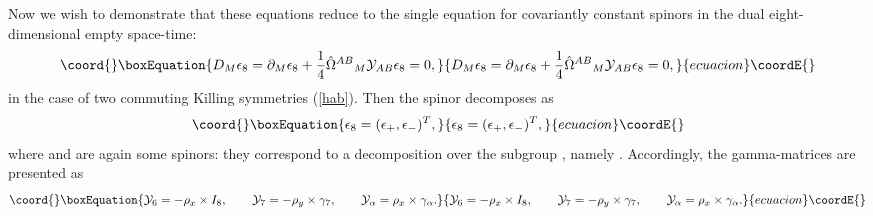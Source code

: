 \documentclass[a4paper,12pt]{article}
\begin{document}
Now we wish to demonstrate that these equations reduce to the
single equation for covariantly constant spinors in the dual
eight-dimensional empty space-time:
\begin{equation}\coord{}\boxEquation{\label{8dk}
D_M \epsilon_8 = \partial_M \epsilon_8 + \frac14 \hat
\Omega^{AB}{}_M {\cal Y}_{AB} \epsilon_8 = 0,
}{D_M \epsilon_8 = \partial_M \epsilon_8 + \frac14 \hat
\Omega^{AB}{}_M {\cal Y}_{AB} \epsilon_8 = 0,
}{ecuacion}\coordE{}\end{equation}
in the case of two commuting Killing symmetries (\ref{hab}).
Then the \coordHE{} spinor decomposes as \coordHE{}
\begin{equation}\coord{}\boxEquation{
\epsilon_8 = (\epsilon_+, \epsilon_-)^T,
}{
\epsilon_8 = (\epsilon_+, \epsilon_-)^T,
}{ecuacion}\coordE{}\end{equation}
where \myHighlight{$\epsilon_{+}$}\coordHE{} and \myHighlight{$\epsilon_{-}$}\coordHE{} are again some \coordHE{}
spinors: they correspond to a decomposition over the subgroup
\coordHE{}, namely \coordHE{}.
Accordingly, the \coordHE{} gamma-matrices are presented as
\begin{equation}\coord{}\boxEquation{
{\cal Y}_6 = -\rho_x \times I_8 , \qquad {\cal Y}_7 = - \rho_y
\times \gamma_7, \qquad {\cal Y}_\alpha = \rho_x \times
\gamma_\alpha.
}{
{\cal Y}_6 = -\rho_x \times I_8 , \qquad {\cal Y}_7 = - \rho_y
\times \gamma_7, \qquad {\cal Y}_\alpha = \rho_x \times
\gamma_\alpha.
}{ecuacion}\coordE{}\end{equation}
\end{document}
